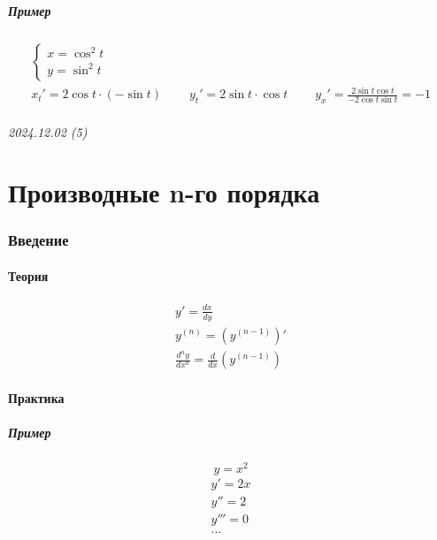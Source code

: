 \documentclass{article}
\begin{document}
\subsubsection{Пример}
\begin{gather*}
    \begin{cases}
        x = \cos^2 t \\
        y = \sin^2 t
    \end{cases} \\
    x_t' = 2 \cos t \cdot (-\sin t) ~~~~~~~~~~
    y_t' = 2 \sin t \cdot \cos t    ~~~~~~~~~~
    y_x' = \frac{2 \sin t \cos t}{-2\cos t \sin t} = -1
\end{gather*}




\newpage
\paragraph{2024.12.02 (5)}
\part{Производные n-го порядка}

\section{Введение}
\subsection{Теория}
\begin{gather*}
    y' = \frac{dx}{dy} \\
    y^{(n)} = \left( y^{(n - 1)} \right)' \\
    \frac{d^n y}{d x^n} = \frac{d}{dx} \left( y^{(n - 1)} \right) 
\end{gather*}

\subsection{Практика}

\subsubsection{Пример}
\[
    y = x^2
\]
\begin{gather*}
    y'   = 2x \\
    y''  = 2  \\
    y''' = 0  \\
    \dots
\end{gather*}
\end{document}
